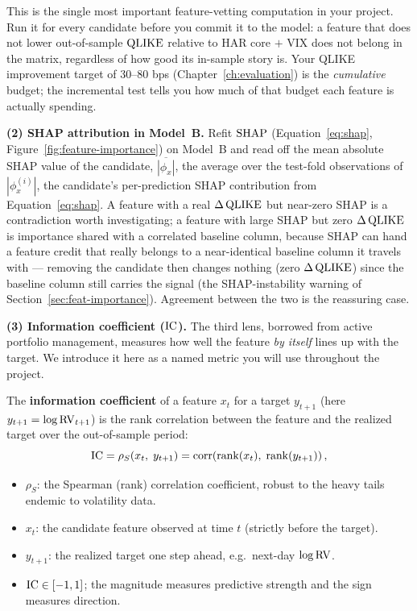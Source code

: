\begin{projectconnection}
This is the single most important feature-vetting computation in your project. Run it for every candidate before you commit it to the model: a feature that does not lower out-of-sample $\operatorname{QLIKE}$ relative to HAR core $+$ VIX does not belong in the matrix, regardless of how good its in-sample story is. Your QLIKE improvement target of 30--80 bps (Chapter~\ref{ch:evaluation}) is the \emph{cumulative} budget; the incremental test tells you how much of that budget each feature is actually spending.
\end{projectconnection}

\textbf{(2) SHAP attribution in Model~B.} Refit $\operatorname{SHAP}$ (Equation~\ref{eq:shap}, Figure~\ref{fig:feature-importance}) on Model~B and read off the mean absolute SHAP value of the candidate, $\overline{|\phi_x|}$, the average over the test-fold observations of $|\phi_x^{(i)}|$, the candidate's per-prediction SHAP contribution from Equation~\ref{eq:shap}. A feature with a real $\Delta\operatorname{QLIKE}$ but near-zero SHAP is a contradiction worth investigating; a feature with large SHAP but zero $\Delta\operatorname{QLIKE}$ is importance shared with a correlated baseline column, because SHAP can hand a feature credit that really belongs to a near-identical baseline column it travels with --- removing the candidate then changes nothing (zero $\Delta\operatorname{QLIKE}$) since the baseline column still carries the signal (the SHAP-instability warning of Section~\ref{sec:feat-importance}). Agreement between the two is the reassuring case.

\textbf{(3) Information coefficient ($\operatorname{IC}$).} The third lens, borrowed from active portfolio management, measures how well the feature \emph{by itself} lines up with the target. We introduce it here as a named metric you will use throughout the project.

\begin{definition}\label{def:ic}
The \textbf{information coefficient} of a feature $x_t$ for a target $y_{t+1}$ (here $y_{t+1} = \log \operatorname{RV}_{t+1}$) is the rank correlation between the feature and the realized target over the out-of-sample period:
\begin{equation}\label{eq:ic}
\operatorname{IC} = \rho_S\!\left(x_t,\; y_{t+1}\right) = \operatorname{corr}\!\left(\operatorname{rank}(x_t),\; \operatorname{rank}(y_{t+1})\right),
\end{equation}
\begin{itemize}[nosep]
  \item $\rho_S$: the Spearman (rank) correlation coefficient, robust to the heavy tails endemic to volatility data.
  \item $x_t$: the candidate feature observed at time $t$ (strictly before the target).
  \item $y_{t+1}$: the realized target one step ahead, e.g.\ next-day $\log \operatorname{RV}$.
  \item $\operatorname{IC} \in [-1, 1]$; the magnitude measures predictive strength and the sign measures direction.
\end{itemize}
\end{definition}


